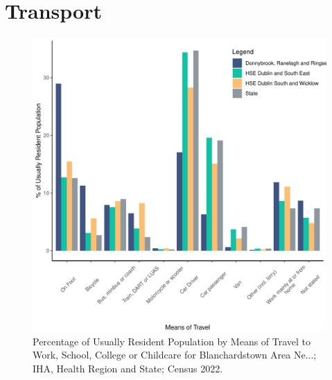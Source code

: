 \documentclass{article}
\begin{document}
\section{Transport}\label{sect:Trans}
\begin{figure}[H]
	\centering
	\includegraphics[width = 120mm]{../figures/TravelED.pdf}
	\caption{Percentage of Usually Resident Population by Means of Travel to Work, School, College or Childcare for Blanchardstown Area Ne...; IHA, Health Region and State; Census 2022.}
	\label{fig:vbnv}
	\end{figure}
\end{document}
